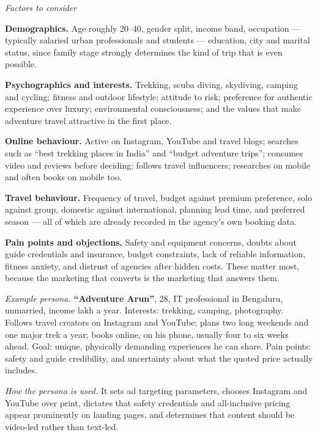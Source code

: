 \begin{qlist}
\textit{Factors to consider}
\begin{apts}\setcounter{enumi}{5}
\item \textbf{Demographics.} Age roughly 20--40, gender split, income band,
      occupation --- typically salaried urban professionals and students ---
      education, city and marital status, since family stage strongly determines
      the kind of trip that is even possible.
\item \textbf{Psychographics and interests.} Trekking, scuba diving, skydiving,
      camping and cycling; fitness and outdoor lifestyle; attitude to risk;
      preference for authentic experience over luxury; environmental
      consciousness; and the values that make adventure travel attractive in the
      first place.
\item \textbf{Online behaviour.} Active on Instagram, YouTube and travel blogs;
      searches such as ``best trekking places in India'' and ``budget adventure
      trips''; consumes video and reviews before deciding; follows travel
      influencers; researches on mobile and often books on mobile too.
\item \textbf{Travel behaviour.} Frequency of travel, budget against premium
      preference, solo against group, domestic against international, planning
      lead time, and preferred season --- all of which are already recorded in
      the agency's own booking data.
\item \textbf{Pain points and objections.} Safety and equipment concerns, doubts
      about guide credentials and insurance, budget constraints, lack of
      reliable information, fitness anxiety, and distrust of agencies after
      hidden costs. These matter most, because the marketing that converts is
      the marketing that answers them.
\end{apts}

\textit{Example persona.} \textbf{``Adventure Arun''}, 28, IT professional in
Bengaluru, unmarried, income  lakh a year. Interests: trekking,
camping, photography. Follows travel creators on Instagram and YouTube; plans
two long weekends and one major trek a year; books online, on his phone,
usually four to six weeks ahead. Goal: unique, physically demanding experiences
he can share. Pain points: safety and guide credibility, and uncertainty about
what the quoted price actually includes.

\textit{How the persona is used.} It sets ad targeting parameters, chooses
Instagram and YouTube over print, dictates that safety credentials and
all-inclusive pricing appear prominently on landing pages, and determines that
content should be video-led rather than text-led.

\end{qlist}
